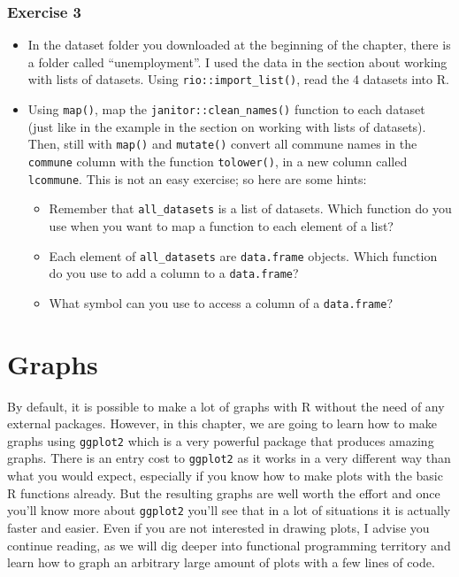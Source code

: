\documentclass[]{gitbook}
\providecommand{\tightlist}{%
  \setlength{\itemsep}{0pt}\setlength{\parskip}{0pt}}
\theoremstyle{definition}
\theoremstyle{definition}
\theoremstyle{definition}
\theoremstyle{remark}
\begin{document}
\hypertarget{exercise-3-1}{%
\subsubsection*{Exercise 3}\label{exercise-3-1}}

\begin{itemize}
\item
  In the dataset folder you downloaded at the beginning of the chapter,
  there is a folder called ``unemployment''. I used the data in the
  section about working with lists of datasets. Using
  \texttt{rio::import\_list()}, read the 4 datasets into R.
\item
  Using \texttt{map()}, map the \texttt{janitor::clean\_names()}
  function to each dataset (just like in the example in the section on
  working with lists of datasets). Then, still with \texttt{map()} and
  \texttt{mutate()} convert all commune names in the \texttt{commune}
  column with the function \texttt{tolower()}, in a new column called
  \texttt{lcommune}. This is not an easy exercise; so here are some
  hints:

  \begin{itemize}
  \tightlist
  \item
    Remember that \texttt{all\_datasets} is a list of datasets. Which
    function do you use when you want to map a function to each element
    of a list?
  \item
    Each element of \texttt{all\_datasets} are \texttt{data.frame}
    objects. Which function do you use to add a column to a
    \texttt{data.frame}?
  \item
    What symbol can you use to access a column of a \texttt{data.frame}?
  \end{itemize}
\end{itemize}

\hypertarget{graphs}{%
\section{Graphs}\label{graphs}}

By default, it is possible to make a lot of graphs with R without the
need of any external packages. However, in this chapter, we are going to
learn how to make graphs using \texttt{ggplot2} which is a very powerful
package that produces amazing graphs. There is an entry cost to
\texttt{ggplot2} as it works in a very different way than what you would
expect, especially if you know how to make plots with the basic R
functions already. But the resulting graphs are well worth the effort
and once you'll know more about \texttt{ggplot2} you'll see that in a
lot of situations it is actually faster and easier. Even if you are not
interested in drawing plots, I advise you continue reading, as we will
dig deeper into functional programming territory and learn how to graph
an arbitrary large amount of plots with a few lines of code.
\end{document}
